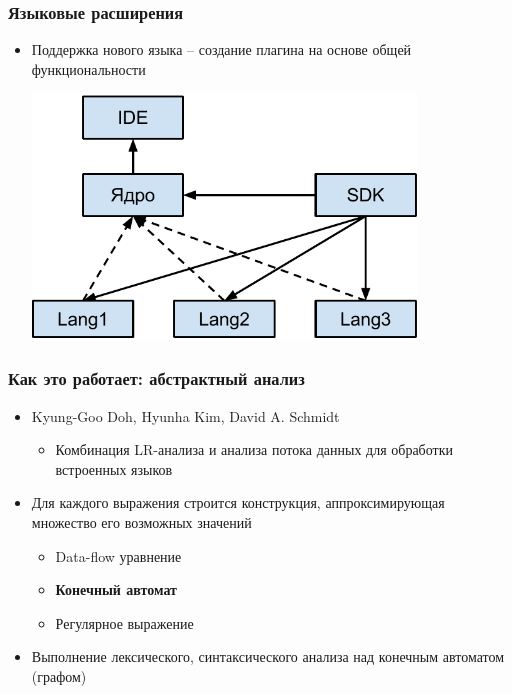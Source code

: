 \documentclass{beamer}
\begin{document}
\begin{frame}[fragile]
	\transwipe[direction=90]
	\frametitle{Языковые расширения}
	\begin{itemize}
	    \item Поддержка нового языка -- создание плагина на основе общей функциональности
        \begin{center}
            \includegraphics[width=290pt]{picts/Structure.pdf}
        \end{center}
    \end{itemize}
            
\end{frame}

\begin{frame}[fragile]
	\transwipe[direction=90]
	\frametitle{Как это работает: абстрактный анализ }
	\begin{itemize}
    	\item Kyung-Goo Doh, Hyunha Kim, David A. Schmidt
    	\begin{itemize}
    		\item Комбинация LR-анализа и анализа потока данных для обработки встроенных языков
        \end{itemize}
	    \item Для каждого выражения строится конструкция, аппроксимирующая множество его возможных значений
    	\begin{itemize}
    		\item Data-flow уравнение
        	\item \textbf{Конечный автомат}
        	\item Регулярное выражение
        \end{itemize}
	    \item Выполнение лексического, синтаксического анализа над конечным автоматом (графом)
    \end{itemize}
\end{frame}
\end{document}
